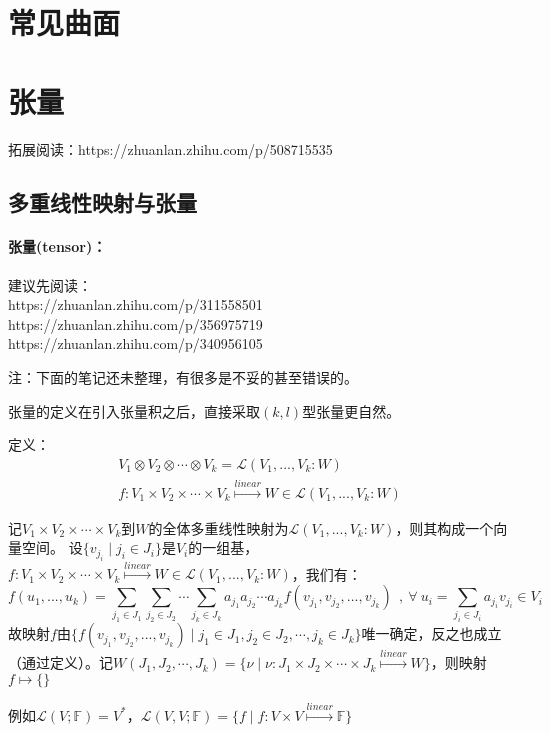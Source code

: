 \documentclass[zihao=5,UTF8]{report}
\def\F{\mathbb{F}}
\theoremstyle{mystyle} %
\begin{document}
\chapter{常见曲面}
\chapter{张量}

拓展阅读：https://zhuanlan.zhihu.com/p/508715535

\section{多重线性映射与张量}

\subsubsection{张量(tensor)：}
建议先阅读：\\ 
https://zhuanlan.zhihu.com/p/311558501\\
https://zhuanlan.zhihu.com/p/356975719\\ 
https://zhuanlan.zhihu.com/p/340956105\par
{\color{red}注：下面的笔记还未整理，有很多是不妥的甚至错误的。}
{\par\color{gray}\small
张量的定义在引入张量积之后，直接采取$(k,l)$型张量更自然。
\par}

定义：\begin{gather*}
    V_1\otimes V_2\otimes \cdots \otimes V_k  =  \mathscr{L}(V_1,...,V_k:W)\\
    f:V_1\times V_2\times \cdots \times V_k \overset{linear}{\longmapsto }W \in \mathscr{L}(V_1,...,V_k:W)
\end{gather*}  
{\par\color{gray}\small
记$V_1\times V_2\times \cdots \times V_k$到$W$的全体多重线性映射为$\mathscr{L}(V_1,...,V_k:W)$，则其构成一个向量空间。 设$\{v_{j_i}\mid j_i \in J_i\}$是$V_i$的一组基，$f:V_1\times V_2\times \cdots \times V_k \overset{linear}{\longmapsto }W \in \mathscr{L}(V_1,...,V_k:W)$，我们有：
\begin{equation*}
    f(u_1,...,u_k)=\sum_{j_1\in J_1}\sum_{j_2\in J_2}\cdots \sum_{j_k\in J_k}a_{j_1}a_{j_2}\cdots a_{j_k}f(v_{j_1},v_{j_2},...,v_{j_k})\ \ ,\   \forall\  u_i=\sum_{j_i \in J_i}a_{j_i}v_{j_i}\in V_i
\end{equation*}
故映射$f$由$\{f(v_{j_1},v_{j_2},...,v_{j_k})\mid j_1\in J_1,j_2\in J_2,\cdots,j_k\in J_k\}$唯一确定，反之也成立（通过定义）。记$W(J_1,J_2,\cdots,J_k) = \{\nu \mid \nu: J_1\times J_2\times \cdots \times J_k \overset{linear}{\longmapsto} W\}$，则映射$f\longmapsto \{\}$
\par}
{\par\color{gray}\small
例如$\mathscr{L}(V;\F)=V^*$，$\mathscr{L}(V,V;\F) = \{f\mid f:V \times V \overset{linear}{\longmapsto} \F\}$
\par}
\end{document}

